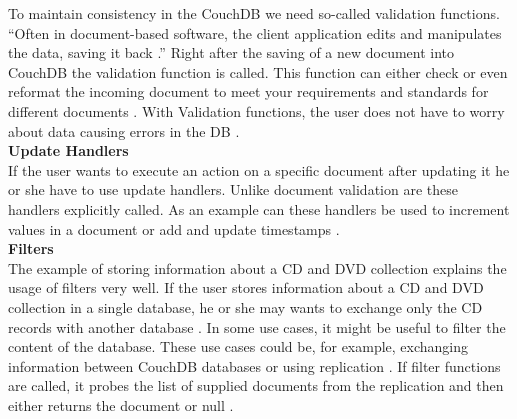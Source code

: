To maintain consistency in the CouchDB we need so-called validation functions. ``Often in document-based software, the client application edits and manipulates the data, saving it back \cite{CouchDB.Guide}.'' Right after the saving of a new document into CouchDB the validation function is called. This function can either check or even reformat the incoming document to meet your requirements and standards for different documents \cite{Brown.2012}. With Validation functions, the user does not have to worry about data causing errors in the DB \cite{CouchDB.Guide}. \\
\newline
\textbf{Update Handlers}\\
If the user wants to execute an action on a specific document after updating it he or she have to use update handlers. Unlike document validation are these handlers explicitly called. As an example can these handlers be used to increment values in a document or add and update timestamps \cite{Brown.2012}. \\ 
\newline
\textbf{Filters}\\
The example of storing information about a CD and DVD collection explains the usage of filters very well.
If the user stores information about a CD and DVD collection in a single database, he or she may wants to exchange only the CD records with another database \cite{Brown.2012}. In some use cases, it might be useful to filter the content of the database. These use cases could be, for example, exchanging information between CouchDB databases or using replication \cite{Brown.2012}. If filter functions are called, it probes the list of supplied documents from the replication and then either returns the document or null \cite{Brown.2012}. \\


